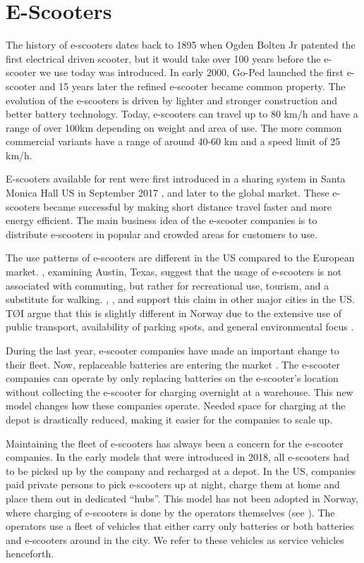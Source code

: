\section{E-Scooters}\label{escooters}

The history of e-scooters dates back to 1895 when Ogden Bolten Jr patented the first electrical driven scooter, but it would take over 100 years before the e-scooter we use today was introduced. In early 2000, Go-Ped launched the first e-scooter and 15 years later the refined e-scooter became common property. The evolution of the e-scooters is driven by lighter and stronger construction and better battery technology. Today, e-scooters can travel up to 80 km/h and have a range of over 100km depending on weight and area of use. The more common commercial variants have a range of around 40-60 km and a speed limit of 25 km/h. 

E-scooters available for rent were first introduced in a sharing system in Santa Monica Hall US in September 2017 \citep{hall_bird_2017}, and later to the global market. These e-scooters became successful by making short distance travel faster and more energy efficient. The main business idea of the e-scooter companies is to distribute e-scooters in popular and crowded areas for customers to use. 

The use patterns of e-scooters are different in the US compared to the European market. \citet{caspi_spatial_2020}, examining Austin, Texas, suggest that the usage of e-scooters is not associated with commuting, but rather for recreational use, tourism, and a substitute for walking. \citet{mathew_analysis_nodate}, \citet{mckenzie_spatiotemporal_2019}, and  \citet{noland_trip_2019} support this claim in other major cities in the US. TØI argue that this is slightly different in Norway due to the extensive use of public transport, availability of parking spots, and general environmental focus \citep{fearnley_delte_2020}. 

During the last year, e-scooter companies have made an important change to their fleet. Now, replaceable batteries are entering the market \citep{tier_mobility_tier_2019}. The e-scooter companies can operate by only replacing batteries on the e-scooter's location without collecting the e-scooter for charging overnight at a warehouse. This new model changes how these companies operate. Needed space for charging at the depot is drastically reduced, making it easier for the companies to scale up. 

Maintaining the fleet of e-scooters has always been a concern for the e-scooter companies. In the early models that were introduced in 2018, all e-scooters had to be picked up by the company and recharged at a depot. In the US, companies paid private persons to pick e-scooters up at night, charge them at home and place them out in dedicated “hubs”. This model has not been adopted in Norway, where charging of e-scooters is done by the operators themselves (see ). The operators use a fleet of vehicles that either carry only batteries or both batteries and e-scooters around in the city. We refer to these vehicles as service vehicles henceforth. 

